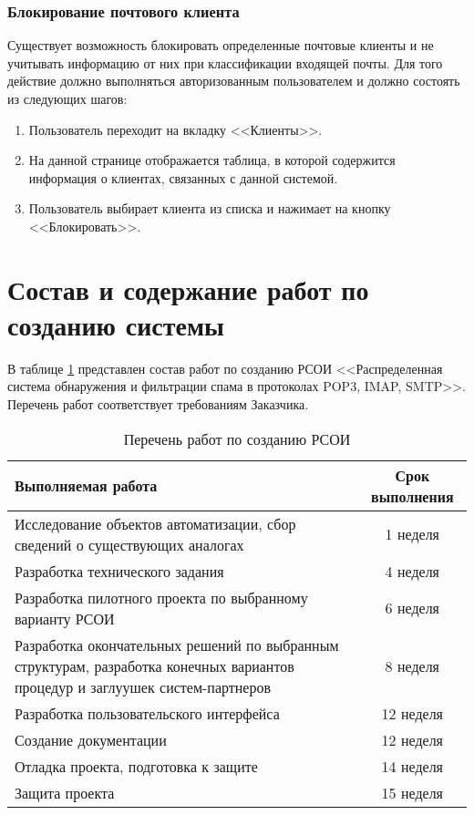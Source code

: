 \subsubsection{Блокирование почтового клиента}
Существует возможность блокировать определенные почтовые клиенты и не учитывать информацию от них при классификации входящей почты. Для того действие должно выполняться авторизованным пользователем и должно состоять из следующих шагов:

\begin{enumerate}
  \item Пользователь переходит на вкладку <<Клиенты>>.
  \item На данной странице отображается таблица, в которой содержится информация о клиентах, связанных с данной системой.
  \item Пользователь выбирает клиента из списка и нажимает на кнопку <<Блокировать>>.
\end{enumerate}

\section{Состав и содержание работ по созданию системы}
В таблице \ref{tab:sostav} представлен состав работ по созданию РСОИ <<Распределенная система обнаружения и фильтрации спама в протоколах POP3, IMAP, SMTP>>. Перечень работ соответствует требованиям Заказчика.

\begin{table}[ht]
  \caption{Перечень работ по созданию РСОИ}
  \begin{tabular}{|p{}|c|}
  \hline
  Выполняемая работа & Срок выполнения\\
  \hline
  Исследование объектов автоматизации, сбор сведений о существующих аналогах & 1 неделя \\
  \hline
  Разработка технического задания & 4 неделя \\
  \hline
  Разработка пилотного проекта по выбранному варианту РСОИ & 6 неделя \\
  \hline
  Разработка окончательных решений по выбранным структурам, разработка конечных вариантов процедур и заглуушек систем-партнеров & 8 неделя \\
  \hline
  Разработка пользовательского интерфейса & 12 неделя \\ 
  \hline
   Создание документации & 12 неделя \\
  \hline
  Отладка проекта, подготовка к защите & 14 неделя \\
  \hline
  Защита проекта & 15 неделя\\
  \hline
  \end{tabular}
  \label{tab:sostav}
\end{table}


